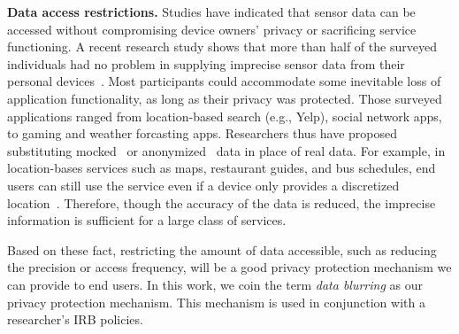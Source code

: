 \textbf{Data access restrictions.}
Studies have indicated that 
sensor data can be accessed without compromising device 
owners' privacy or sacrificing service functioning.
A recent research study shows that more than half of the 
surveyed individuals had no problem in supplying imprecise 
sensor data from their personal devices~\cite{fawaz2014location}. 
Most participants could accommodate some inevitable loss of application 
functionality, as long as their privacy was protected. Those surveyed
applications ranged from location-based search (e.g., Yelp), social 
network apps, to gaming and weather forcasting apps. 
Researchers thus have proposed 
substituting mocked~\cite{beresford2011mockdroid} or 
anonymized~\cite{zhou2011taming} data in place of real data. 
For example, in location-bases services such as maps, 
restaurant guides, and bus schedules, end users can still use the 
service even if a device only provides a discretized 
location~\cite{amini2011cache, krumm2007inference}. Therefore, 
though the accuracy of the data is reduced, 
the imprecise information is sufficient for a large class of services. 

Based on these fact, restricting 
the amount of data accessible, such as reducing the precision or 
access frequency, will be a good privacy protection mechanism we can 
provide to end users. In this work, we coin the term \textit{data blurring}
as our privacy protection mechanism. This mechanism is used in 
conjunction with a researcher's IRB policies. 


